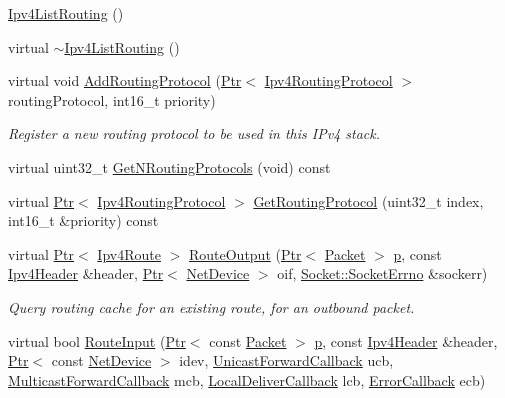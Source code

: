 \begin{DoxyCompactItemize}
\item 
\hyperlink{classns3_1_1Ipv4ListRouting_abe8d2b2dbc3ebc434623fb2c54805df4}{Ipv4\+List\+Routing} ()
\item 
virtual \hyperlink{classns3_1_1Ipv4ListRouting_a33643ef9e4ed3dc88ac193fc3dd5e713}{$\sim$\+Ipv4\+List\+Routing} ()
\item 
virtual void \hyperlink{classns3_1_1Ipv4ListRouting_aac3d4da5db389114e7b980c6136f11a2}{Add\+Routing\+Protocol} (\hyperlink{classns3_1_1Ptr}{Ptr}$<$ \hyperlink{classns3_1_1Ipv4RoutingProtocol}{Ipv4\+Routing\+Protocol} $>$ routing\+Protocol, int16\+\_\+t priority)
\begin{DoxyCompactList}\small\item\em Register a new routing protocol to be used in this I\+Pv4 stack. \end{DoxyCompactList}\item 
virtual uint32\+\_\+t \hyperlink{classns3_1_1Ipv4ListRouting_ace90506497803859bebb5cbfa04b56ce}{Get\+N\+Routing\+Protocols} (void) const 
\item 
virtual \hyperlink{classns3_1_1Ptr}{Ptr}$<$ \hyperlink{classns3_1_1Ipv4RoutingProtocol}{Ipv4\+Routing\+Protocol} $>$ \hyperlink{classns3_1_1Ipv4ListRouting_a1c47488f8ed4775ff5c33add867652b9}{Get\+Routing\+Protocol} (uint32\+\_\+t index, int16\+\_\+t \&priority) const 
\item 
virtual \hyperlink{classns3_1_1Ptr}{Ptr}$<$ \hyperlink{classns3_1_1Ipv4Route}{Ipv4\+Route} $>$ \hyperlink{classns3_1_1Ipv4ListRouting_ade770ead0b10cc8bc0294c018d2c427b}{Route\+Output} (\hyperlink{classns3_1_1Ptr}{Ptr}$<$ \hyperlink{classns3_1_1Packet}{Packet} $>$ \hyperlink{lte__link__budget__x2__handover__measures_8m_ac9de518908a968428863f829398a4e62}{p}, const \hyperlink{classns3_1_1Ipv4Header}{Ipv4\+Header} \&header, \hyperlink{classns3_1_1Ptr}{Ptr}$<$ \hyperlink{classns3_1_1NetDevice}{Net\+Device} $>$ oif, \hyperlink{classns3_1_1Socket_ada1328c5ae0c28cb2a982caf8f6d6cca}{Socket\+::\+Socket\+Errno} \&sockerr)
\begin{DoxyCompactList}\small\item\em Query routing cache for an existing route, for an outbound packet. \end{DoxyCompactList}\item 
virtual bool \hyperlink{classns3_1_1Ipv4ListRouting_ae354d19adb18a5a2d12f2573637a0a29}{Route\+Input} (\hyperlink{classns3_1_1Ptr}{Ptr}$<$ const \hyperlink{classns3_1_1Packet}{Packet} $>$ \hyperlink{lte__link__budget__x2__handover__measures_8m_ac9de518908a968428863f829398a4e62}{p}, const \hyperlink{classns3_1_1Ipv4Header}{Ipv4\+Header} \&header, \hyperlink{classns3_1_1Ptr}{Ptr}$<$ const \hyperlink{classns3_1_1NetDevice}{Net\+Device} $>$ idev, \hyperlink{classns3_1_1Ipv4RoutingProtocol_a3453a85764cbbb1e704da7e919aa5d19}{Unicast\+Forward\+Callback} ucb, \hyperlink{classns3_1_1Ipv4RoutingProtocol_a26e76f7a555462e6c08fceda64a99d58}{Multicast\+Forward\+Callback} mcb, \hyperlink{classns3_1_1Ipv4RoutingProtocol_aa6ffa0159cb143daa3c46d2ba69bb1b9}{Local\+Deliver\+Callback} lcb, \hyperlink{classns3_1_1Ipv4RoutingProtocol_a0348285418c30d5021b08f7a68af21ea}{Error\+Callback} ecb)

\end{DoxyCompactItemize}
